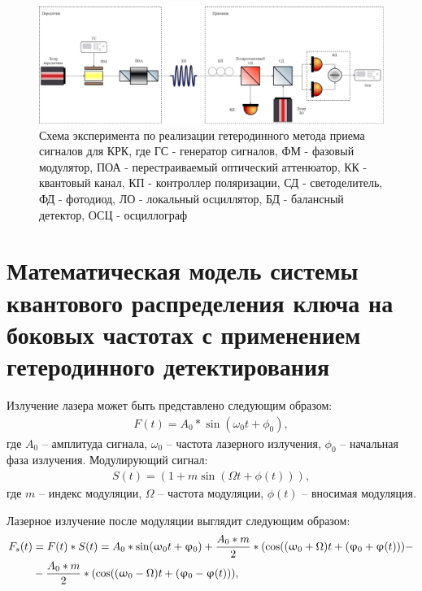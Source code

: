 \begin{figure}
    \centering
    \includegraphics[width = \textwidth]{images/Гетеродин схема новая2 .png}
    \caption{Схема эксперимента по реализации гетеродинного метода приема сигналов для КРК, где ГС - генератор сигналов, ФМ - фазовый модулятор, ПОА - перестраиваемый оптический аттенюатор, КК - квантовый канал, КП - контроллер поляризации, СД - светоделитель, ФД - фотодиод, ЛО - локальный осциллятор, БД - балансный детектор, ОСЦ - осциллограф}
    \label{fig:het true ch3}
\end{figure}
\section{Математическая модель системы квантового распределения ключа на боковых частотах с применением гетеродинного детектирования}\label{sec:ch3/sect3}
Излучение лазера может быть представлено следующим образом:
\begin{align}
F(t) = A_0 * \sin(\omega_0 t + \phi_0),
\end{align}
где $A_0$ -- амплитуда сигнала, $\omega_0$ -- частота лазерного излучения, $\phi_0$ -- начальная фаза излучения.
Модулирующий сигнал:
\begin{align}
S(t) = (1+ m\sin(\Omega t  + \phi (t))),
\end{align} 
где $m$ -- индекс модуляции, $\Omega$ -- частота модуляции, $\phi (t)$ -- вносимая модуляция.

Лазерное излучение после модуляции выглядит следующим образом:
\begin{align}
\label{eq:laser}
F_s(t) &= F(t) * S(t) = A_0 * \sin(\omega_0 t + \phi_0) + \frac{A_0 * m}{2} * (\cos((\omega_0 + \Omega)t + (\phi_0 + \phi (t))) - \notag \\
&- \frac{A_0 * m}{2} * (\cos((\omega_0 - \Omega)t + (\phi_0 - \phi (t))),
\end{align}


